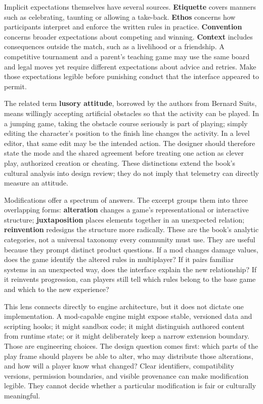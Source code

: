 Implicit expectations themselves have several sources. \textbf{Etiquette} covers manners such as celebrating, taunting or allowing a take-back. \textbf{Ethos} concerns how participants interpret and enforce the written rules in practice. \textbf{Convention} concerns broader expectations about competing and winning. \textbf{Context} includes consequences outside the match, such as a livelihood or a friendship. A competitive tournament and a parent's teaching game may use the same board and legal moves yet require different expectations about advice and retries. Make those expectations legible before punishing conduct that the interface appeared to permit.

The related term \textbf{lusory attitude}, borrowed by the authors from Bernard Suits, means willingly accepting artificial obstacles so that the activity can be played. In a jumping game, taking the obstacle course seriously is part of playing; simply editing the character's position to the finish line changes the activity. In a level editor, that same edit may be the intended action. The designer should therefore state the mode and the shared agreement before treating one action as clever play, authorized creation or cheating. These distinctions extend the book's cultural analysis into design review; they do not imply that telemetry can directly measure an attitude.

Modifications offer a spectrum of answers. The excerpt groups them into three overlapping forms: \textbf{alteration} changes a game's representational or interactive structure; \textbf{juxtaposition} places elements together in an unexpected relation; \textbf{reinvention} redesigns the structure more radically. These are the book's analytic categories, not a universal taxonomy every community must use. They are useful because they prompt distinct product questions. If a mod changes damage values, does the game identify the altered rules in multiplayer? If it pairs familiar systems in an unexpected way, does the interface explain the new relationship? If it reinvents progression, can players still tell which rules belong to the base game and which to the new experience?

This lens connects directly to engine architecture, but it does not dictate one implementation. A mod-capable engine might expose stable, versioned data and scripting hooks; it might sandbox code; it might distinguish authored content from runtime state; or it might deliberately keep a narrow extension boundary. Those are engineering choices. The design question comes first: which parts of the play frame should players be able to alter, who may distribute those alterations, and how will a player know what changed? Clear identifiers, compatibility versions, permission boundaries, and visible provenance can make modification legible. They cannot decide whether a particular modification is fair or culturally meaningful.

